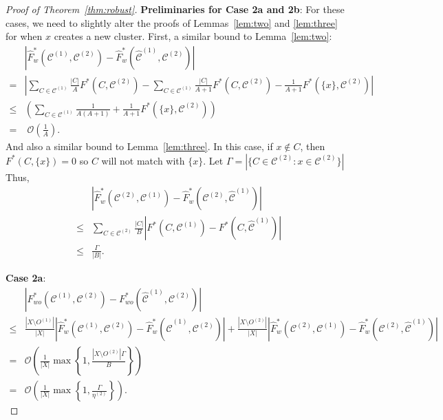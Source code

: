 \documentclass[review,los,12pt]{ryethesis}
\newcommand\cCone{\mathcal{C}^{(1)}}
\newcommand\hcCone{\hat{\mathcal{C}}^{(1)}}
\newcommand\cCtwo{\mathcal{C}^{(2)}}
\newcommand{\bigO}{\mathcal{O}}
\begin{document}
\begin{proof}[Proof of Theorem~\ref{thm:robust}]
    \textbf{Preliminaries for Case 2a and 2b}:
    For these cases, we need to slightly alter the proofs of Lemmas~\ref{lem:two} and \ref{lem:three} for when $x$ creates a new cluster.
    First, a similar bound to Lemma~\ref{lem:two}:
    \begin{align*}
        & \left| \hat{F}^*_{w}(\cCone, \cCtwo) - \hat{F}^*_{w}(\hcCone, \cCtwo) \right| \\
        = & \left| \sum_{C \in \cCone} \frac{|C|}{A} F^*(C, \cCtwo) - \sum_{C \in \cCone} \frac{|C|}{A+1} F^*(C, \cCtwo) - \frac{1}{A+1} F^*(\{x\}, \cCtwo) \right| \\
        \leq & \left( \sum_{C \in \cCone} \frac{1}{A(A+1)} + \frac{1}{A+1} F^*(\{x\}, \cCtwo)\right) \\
        = & \; \bigO \left( \frac{1}{A} \right).
    \end{align*}
    And also a similar bound to Lemma~\ref{lem:three}.
    In this case, if $x \not \in C$, then $F^*(C, \{x\}) = 0$ so $C$ will not match with $\{x\}$.
    Let $\Gamma = |\{C \in \cCtwo : x \in \cCtwo\}|$
    Thus, 
    \begin{align*}
        & \left|\hat{F}^*_w(\cCtwo, \cCone) - \hat{F}^*_w(\cCtwo, \hcCone)\right|\\
        \leq & \sum_{C \in \cCtwo} \frac{|C|}{B} \left| F^*(C, \cCone) - F^*(C, \hcCone) \right| \\
        \leq & \frac{\Gamma}{|B|}.
    \end{align*}

    \textbf{Case 2a}:
    \begin{align*}
        & \left| F^*_{wo}(\cCone, \cCtwo) - F^*_{wo}(\hcCone, \cCtwo) \right| \\
        \leq & \frac{|X \setminus O^{(1)}|}{|X|}\left|\hat{F}^*_{w}(\cCone, \cCtwo) - \hat{F}^*_{w}(\hcCone, \cCtwo) \right| + \frac{|X \setminus O^{(2)}|}{|X|} \left| \hat{F}^*_w(\cCtwo, \cCone) - \hat{F}^*_w(\cCtwo, \hcCone) \right| \\
        = & \bigO \left( \frac{1}{|X|} \max \left\{ 1, \frac{|X \setminus O^{(2)}| \Gamma }{B} \right\} \right) \\
        = & \bigO \left( \frac{1}{|X|} \max \left\{ 1, \frac{\Gamma }{\eta^{(2)}} \right\} \right).
    \end{align*}


\end{proof}
\end{document}

